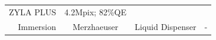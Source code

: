 \documentclass[11pt,singlespacinge,twoside]{reedthesis} %
\begin{document}
\begin{longtable}[]{@{}rccl@{}}
\begin{minipage}[t]{0.23\columnwidth}
ZYLA PLUS\strut
\end{minipage} & \begin{minipage}[t]{0.30\columnwidth}\raggedright
4.2Mpix; 82\%QE\strut
\end{minipage}\tabularnewline
\begin{minipage}[t]{0.20\columnwidth}\raggedleft
Immersion\strut
\end{minipage} & \begin{minipage}[t]{0.16\columnwidth}\centering
Merzhaeuser\strut
\end{minipage} & \begin{minipage}[t]{0.23\columnwidth}\centering
Liquid Dispenser\strut
\end{minipage} & \begin{minipage}[t]{0.30\columnwidth}\raggedright
-\strut
\end{minipage}\tabularnewline
\bottomrule
\end{longtable}
\end{document}
